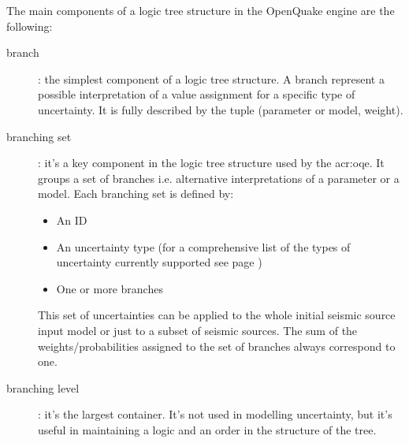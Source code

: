 The main components of a logic tree structure in the OpenQuake engine are 
the following:
\begin{description}
    \item[branch]: the simplest component of a logic tree structure. 
    A branch represent a possible interpretation of a value assignment for
    a specific type of uncertainty. It is fully described by the tuple 
    (parameter or model, weight).

    \begin{center}
    \renewcommand{\psedge}{\ncdiag[armA=0,angleB=180,armB=.5cm]}
    \end{center}
    
    \item[branching set]: it's a key component in the logic tree structure 
    used by the \gls{acr:oqe}. It groups a set of branches i.e. 
    alternative interpretations of a parameter or a model. Each branching
    set is defined by:
    \begin{itemize}
        \item An ID 
        \item An uncertainty type (for a comprehensive list of the types of 
        uncertainty currently supported see page \pageref{list_epistemic_unc})
        \item One or more branches
    \end{itemize}
    
    This set of uncertainties can be applied to the whole initial 
    seismic source input model or just to a subset of seismic sources.
    The sum of the weights/probabilities assigned to the set 
    of branches always correspond to one.

    \item[branching level]: it's the largest container. It's not used in 
    modelling uncertainty, but it's useful in maintaining a logic and an 
    order in the structure of the tree.
\end{description}

